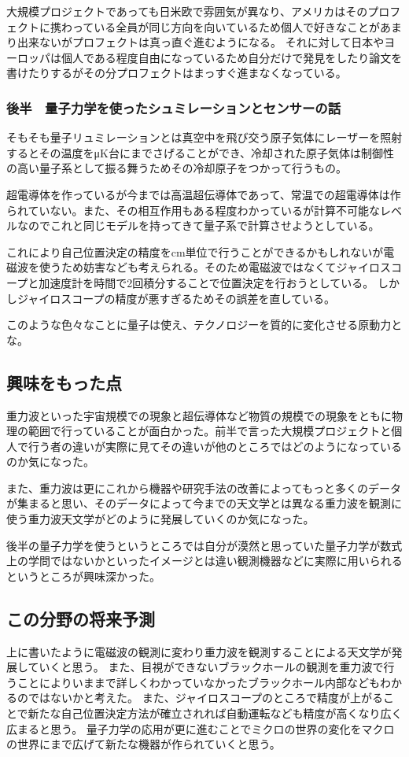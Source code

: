 \documentclass[dvipdfmx]{jsarticle}
\begin{document}
大規模プロジェクトであっても日米欧で雰囲気が異なり、アメリカはそのプロフェクトに携わっている全員が同じ方向を向いているため個人で好きなことがあまり出来ないがプロフェクトは真っ直ぐ進むようになる。
それに対して日本やヨーロッパは個人である程度自由になっているため自分だけで発見をしたり論文を書けたりするがその分プロフェクトはまっすぐ進まなくなっている。

\subsubsection{後半　\textbf{量子力学を使ったシュミレーションとセンサーの話}}

そもそも量子リュミレーションとは真空中を飛び交う原子気体にレーザーを照射するとその温度をμK台にまでさげることができ、冷却された原子気体は制御性の高い量子系として振る舞うためその冷却原子をつかって行うもの。

超電導体を作っているが今までは高温超伝導体であって、常温での超電導体は作られていない。また、その相互作用もある程度わかっているが計算不可能なレベルなのでこれと同じモデルを持ってきて量子系で計算させようとしている。

これにより自己位置決定の精度をcm単位で行うことができるかもしれないが電磁波を使うため妨害なども考えられる。そのため電磁波ではなくてジャイロスコープと加速度計を時間で2回積分することで位置決定を行おうとしている。
しかしジャイロスコープの精度が悪すぎるためその誤差を直している。

このような色々なことに量子は使え、テクノロジーを質的に変化させる原動力とな。

\subsection{興味をもった点}
重力波といった宇宙規模での現象と超伝導体など物質の規模での現象をともに物理の範囲で行っていることが面白かった。前半で言った大規模プロジェクトと個人で行う者の違いが実際に見てその違いが他のところではどのようになっているのか気になった。

また、重力波は更にこれから機器や研究手法の改善によってもっと多くのデータが集まると思い、そのデータによって今までの天文学とは異なる重力波を観測に使う重力波天文学がどのように発展していくのか気になった。

後半の量子力学を使うというところでは自分が漠然と思っていた量子力学が数式上の学問ではないかといったイメージとは違い観測機器などに実際に用いられるというところが興味深かった。

\subsection{この分野の将来予測}
上に書いたように電磁波の観測に変わり重力波を観測することによる天文学が発展していくと思う。
また、目視ができないブラックホールの観測を重力波で行うことによりいままで詳しくわかっていなかったブラックホール内部などもわかるのではないかと考えた。
また、ジャイロスコープのところで精度が上がることで新たな自己位置決定方法が確立されれば自動運転なども精度が高くなり広く広まると思う。
量子力学の応用が更に進むことでミクロの世界の変化をマクロの世界にまで広げて新たな機器が作られていくと思う。
\end{document}
